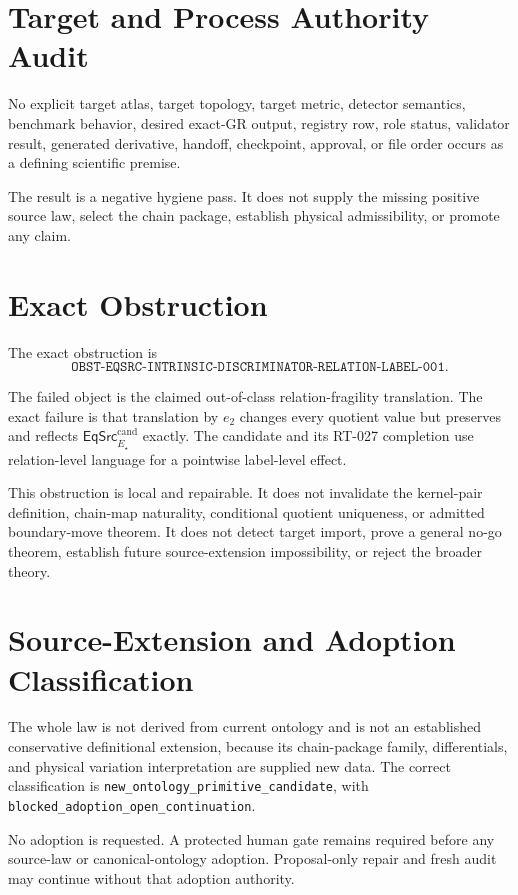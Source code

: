 \documentclass[11pt]{article}
\newcommand{\EqCand}{\mathsf{EqSrc}^{\mathrm{cand}}}
\begin{document}
\section{Target and Process Authority Audit}

No explicit target atlas, target topology, target metric, detector semantics,
benchmark behavior, desired exact-GR output, registry row, role status,
validator result, generated derivative, handoff, checkpoint, approval, or file
order occurs as a defining scientific premise.

The result is a negative hygiene pass. It does not supply the missing positive
source law, select the chain package, establish physical admissibility, or
promote any claim.

\section{Exact Obstruction}

The exact obstruction is
\[
\boxed{\texttt{OBST-EQSRC-INTRINSIC-DISCRIMINATOR-RELATION-LABEL-001}}.
\]

The failed object is the claimed out-of-class relation-fragility translation.
The exact failure is that translation by \(e_2\) changes every quotient value
but preserves and reflects \(\EqCand_{E_\star}\) exactly. The candidate and its
RT-027 completion use relation-level language for a pointwise label-level
effect.

This obstruction is local and repairable. It does not invalidate the
kernel-pair definition, chain-map naturality, conditional quotient uniqueness,
or admitted boundary-move theorem. It does not detect target import, prove a
general no-go theorem, establish future source-extension impossibility, or
reject the broader theory.

\section{Source-Extension and Adoption Classification}

The whole law is not derived from current ontology and is not an established
conservative definitional extension, because its chain-package family,
differentials, and physical variation interpretation are supplied new data.
The correct classification is
\texttt{new\_ontology\_primitive\_candidate}, with
\texttt{blocked\_adoption\_open\_continuation}.

No adoption is requested. A protected human gate remains required before any
source-law or canonical-ontology adoption. Proposal-only repair and fresh audit
may continue without that adoption authority.
\end{document}
